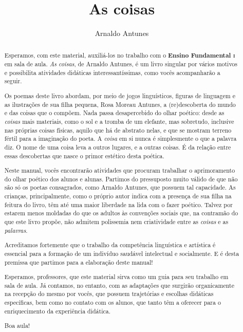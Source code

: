 \documentclass[11pt]{extarticle}
\newcommand{\AutorLivro}{Arnaldo Antunes}
\newcommand{\TituloLivro}{As coisas}
\newcommand{\colaborador}{Renier Silva}
\begin{document}
\title{\TituloLivro}
\author{\AutorLivro}
\def\authornotes{\colaborador}

\date{}
\maketitle

\tableofcontents


\begin{abstract}
Esperamos, com este material,
auxiliá-los no trabalho com o \textbf{Ensino Fundamental \textsc{i}} em 
sala de aula. \textit{As coisas}, de Arnaldo Antunes, é um livro singular
por vários motivos e possibilita atividades didáticas interessantíssimas,
como vocês acompanharão a seguir.

Os poemas deste livro abordam, por meio de jogos linguísticos,
figuras de linguagem e as ilustrações de sua filha pequena, Rosa Moreau
Antunes, a (re)descoberta do mundo e das coisas que o compõem. 
Nada passa desapercebido do olhar poético: desde as \textit{coisas} 
mais materiais, como o sol e a tromba de um elefante, mas sobretudo,
inclusive nas próprias coisas físicas, aquilo que há de abstrato nelas,
e que se mostram terreno fértil para a imaginação do poeta. 
A \textit{coisa} em si nunca é simplesmente o que a palavra diz.
O nome de uma coisa leva a outros lugares, e a outras coisas.
É da relação entre essas descobertas que nasce o primor estético
desta poética. 

Neste manual, vocês encontrarão atividades que procuram 
trabalhar o aprimoramento do olhar poético dos alunos e alunas. 
Partimos do pressuposto muito válido de que não são só os poetas 
consagrados, como Arnaldo Antunes, que possuem tal capacidade. 
As crianças, principalmente, como o próprio autor indica
com a presença de sua filha na feitura do livro, têm até 
uma maior liberdade na lida com o fazer poético. 
Talvez por estarem menos moldadas do que os adultos 
às convenções sociais que, na contramão do que este livro propõe,
não admitem polissemia nem criatividade entre as \textit{coisas}
e as \textit{palavras}. 

Acreditamos fortemente que o trabalho da competência linguística
e artística é essencial para a formação de um indivíduo saudável 
intelectual e socialmente. E é desta premissa que partimos para
a elaboração deste manual!

Esperamos, professores, que este material sirva como um guia 
para seu trabalho em sala de aula. Já contamos, no entanto, com as adaptações
que surgirão organicamente na recepção do mesmo por vocês, que possuem 
trajetórias e escolhas didáticas específicas, bem como no contato com os 
alunos, que tanto têm a oferecer para o enriquecimento da experiência didática.

Boa aula!

\end{abstract}
\end{document}
